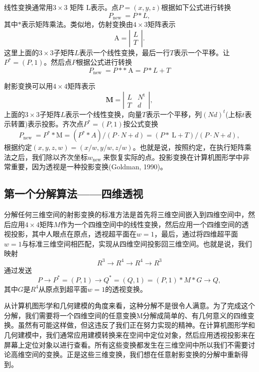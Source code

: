 线性变换通常用$3 \times 3$ 矩阵 $\mathrm{L}$表示。点$P=(x, y, z)$根据如下公式进行转换
$$
P_{\text {new }}=P * L ,
$$
其中$*$表示矩阵乘法。类似地，仿射变换由$4 \times 3$矩阵表示
$$
\mathrm{A}=\left|\begin{array}{c}
L \\ T
\end{array}\right|.
$$
这里上面的$3 \times 3$子矩阵$L$表示一个线性变换，最后一行$T$表示一个平移。让$P^{*}=(P, 1)$。然后点$P$根据公式进行转换
$$
P_{\text {new }}=P* * \mathrm{~A}=P * L+T
$$

射影变换可以用$4 \times 4$矩阵表示
$$
\mathbf{M}=\left|\begin{array}{cc}
L & N^{\mathrm{t}} \\
T & d
\end{array}\right|,
$$
上面的$3 \times 3$子矩阵$L$表示一个线性变换，向量$T$表示一个平移，列$(N d)^{t}$(上标$ t $表示转置)表示投影。齐次点$P^{*}=(P, 1)$按公式变换
$$
P_{\text {new }}=P^* * \mathrm{M}=(P^* * A) /(P \cdot N+d)=(P * \mathrm{~L}+T) /(P \cdot N+d) ,
$$
根据约定$(x, y, z, w)=(x / w, y / w, z / w)$。也就是说，按照约定，在执行矩阵乘法之后，我们除以齐次坐标$w_{\text {new }}$来恢复实际的点。投影变换在计算机图形学中非常重要，因为透视是一种投影变换(Goldman, 1990)。


\subsection*{第一个分解算法——四维透视}
分解任何三维空间的射影变换的标准方法是首先将三维空间嵌入到四维空间中，然后应用$4 \times 4$矩阵$M$作为一个四维空间中的线性变换，然后应用一个四维空间的透视投影，其中人眼点在原点，透视超平面在$w=1$，最后，通过将四维超平面$w=1$与标准三维空间相匹配，实现从四维空间投影回三维空间。也就是说，我们映射
$$
R^{3} \rightarrow R^{4} \rightarrow R^{4} \rightarrow R^{3}
$$
通过发送
$$
P \rightarrow P^{*}=(P, 1) \rightarrow Q^{*}=(Q, 1)=(P, 1) *M * G \rightarrow Q,
$$
其中$G$是$R^{4}$从原点到超平面$w=1$的透视变换。

从计算机图形学和几何建模的角度来看，这种分解不是很令人满意。为了完成这个分解，我们需要将一个四维空间的任意变换M分解成简单的、有几何意义的四维变换。虽然有可能这样做，但这违反了我们正在努力实现的精神。在计算机图形学和几何建模中，我们通常应用建模转换来在空间中定位对象，然后应用透视投影来在屏幕上定位对象以进行查看。所有这些变换都发生在三维空间中所以我们不需要讨论高维空间的变换。正是这些三维变换，我们想在任意射影变换的分解中重新得到。


